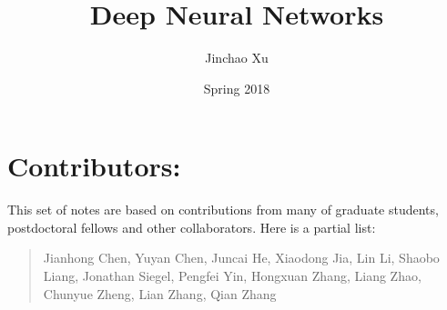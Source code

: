 \documentclass[leqno,labelfig,psfigt,colorlinks]{svmono}
\title{Deep Neural Networks}
\author{Jinchao Xu}
\date{Spring 2018}
\begin{document}
\maketitle

\section*{Contributors:}
This set of notes are based on contributions from many of graduate
students, postdoctoral fellows and other collaborators.   Here is a
partial list:
\begin{quote}
Jianhong Chen, Yuyan Chen, Juncai He, Xiaodong Jia, Lin Li,  Shaobo Liang,
Jonathan Siegel, Pengfei Yin, Hongxuan Zhang, Liang Zhao, Chunyue
Zheng, Lian Zhang, Qian Zhang
\end{quote}
\tableofcontents









\end{document}
